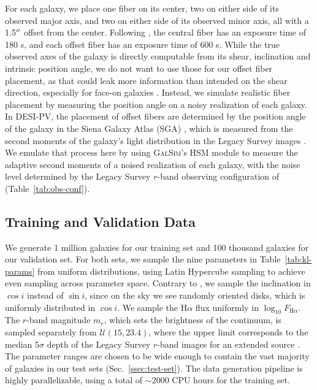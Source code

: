For each galaxy, we place one fiber on its center, two on either side of its observed major axis, and two on either side of its observed minor axis, all with a 1.5${^{\prime\prime}}$ offset from the center. Following \citep{KLDESI}, the central fiber has an exposure time of 180 s, and each offset fiber has an exposure time of 600 s. While the true observed axes of the galaxy is directly computable from its shear, inclination and intrinsic position angle, we do not want to use those for our offset fiber placement, as that could leak more information than intended on the shear direction, especially for face-on galaxies . Instead, we simulate realistic fiber placement by measuring the position angle on a noisy realization of each galaxy. In DESI-PV, the placement of offset fibers are determined by the position angle of the galaxy in the Siena Galaxy Atlas (SGA) \citep{DESIPVTargetSel2023}, which is measured from the second moments of the galaxy's light distribution in the Legacy Survey images \citep{SGA2020}. We emulate that process here by using \textsc{GalSim}'s HSM module to measure the adaptive second moments of a noised realization of each galaxy, with the noise level determined by the Legacy Survey $r$-band observing configuration of \citep{KLDESI} (Table~\ref{tab:obs-conf}).

\subsection{Training and Validation Data}
\label{ssec:datasets}

We generate 1 million galaxies for our training set and 100 thousand galaxies for our validation set. For both sets, we sample the nine parameters in Table~\ref{tab:kl-params} from uniform distributions, using Latin Hypercube sampling to achieve even sampling across parameter space. Contrary to \citep{KLDESI}, we sample the inclination in $\cos i$ instead of $\sin i$, since on the sky we see randomly oriented disks, which is uniformly distributed in $\cos i$. We sample the H$\alpha$ flux uniformly in $\log_{10}F_{\mathrm{H}\alpha}$. The $r$-band magnitude $m_r$, which sets the brightness of the continuum, is sampled separately from $\mathcal{U}(15, 23.4)$, where the upper limit corresponds to the median $5\sigma$ depth of the Legacy Survey $r$-band images for an extended source \citep{KLDESI}. The parameter ranges are chosen to be wide enough to contain the vast majority of galaxies in our test sets (Sec.~\ref{ssec:test-set}). The data generation pipeline is highly parallelizable, using a total of $\sim$2000 CPU hours for the training set.

